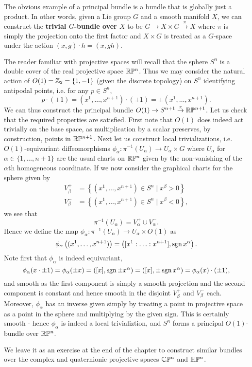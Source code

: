 \begin{exmp}
    The obvious example of a principal bundle is a bundle that is globally just a product. In other words, given
    a Lie group $G$ and a smooth manifold $X$, we can construct the \textbf{trivial $G$-bundle over $X$} to be
    $G\to X\times G\overset{\pi}{\to} X$ where $\pi$ is simply the projection onto the first factor and $X\times G$ is treated as
    a $G$-space under the action $(x,g)\cdot h=(x,gh)$. 
\end{exmp}

\begin{exmp}
    The reader familiar with projective spaces will recall that the sphere $S^n$ is a double cover of the real projective space $\mathbb{R}\mathbb{P}^n$.
    Thus we may consider the natural action of $O(1)=\mathbb{Z}_2=\left\{ 1,-1 \right\}$ (given the discrete topology) on $S^n$ identifying antipodal points,
    i.e. for any $p\in S^n$,
    \[p\cdot (\pm 1)=(x^1,\ldots, x^{n+1})\cdot (\pm 1)=\pm (x^1,\ldots,x^{n+1}).\]
    We can thus construct the principal bundle $O(1)\to S^{n+1}\overset{\pi}{\to} \mathbb{R}\mathbb{P}^{n+1}$. Let us check that the required properties are satisfied.
    First note that $O(1)$ does indeed act trivially on the base space, as multiplication by a scalar preserves, by construction, points in $\mathbb{R}\mathbb{P}^{n+1}$.
    Next let us construct local trivializations, i.e. $O(1)$-equivariant diffeomorphisms $\phi_\alpha:\pi^{-1}(U_\alpha)\to U_\alpha\times G$ where
    $U_\alpha$ for $\alpha\in\{1,\ldots, n+1\}$ are the usual charts on $\mathbb{R}\mathbb{P}^n$ given by the non-vanishing of the $\alpha$th homogeneous coordinate.
    If we now consider the graphical charts for the sphere given by 
    \begin{align*}
        V_\beta^+&=\left\{ (x^1,\ldots,x^{n+1})\in S^n\mid x^\beta>0 \right\}\\
        V_\beta^-&=\left\{ (x^1,\ldots,x^{n+1})\in S^n\mid x^\beta<0 \right\},
    \end{align*}
    we see that
    \[\pi^{-1}(U_\alpha)=V_\alpha^+\cup V_\alpha^-.\]
    Hence we define the map $\phi_\alpha:\pi^{-1}(U_\alpha)\to U_\alpha\times O(1)$ as
    \[\phi_\alpha\left( (x^1,\ldots,x^{n+1}) \right)=\left( [x^1:\ldots:x^{n+1}], \operatorname{sgn} x^{\alpha} \right).\]
    Note first that $\phi_\alpha$ is indeed equivariant,
    \[\phi_\alpha(x\cdot \pm 1)=\phi_\alpha(\pm x)=([x],\operatorname{sgn} \pm x^\alpha)=([x],\pm \operatorname{sgn} x^\alpha)=\phi_\alpha(x)\cdot (\pm 1),\]
    and smooth as the first component is simply a smooth projection and the second component is constant and hence smooth in the disjoint $V_\beta^+$
    and $V_\beta^-$ each. Moreover, $\phi_\alpha$ has an inverse given simply by treating a point in projective space as a point in the sphere
    and multiplying by the given sign. This is certainly smooth - hence $\phi_\alpha$ is indeed a local trivializtion, and $S^n$ forms a principal
    $O(1)$-bundle over $\mathbb{R}\mathbb{P}^n$.

    We leave it as an exercise at the end of the chapter to construct similar bundles over the complex and quaternionic projective spaces $\mathbb{C}\mathbb{P}^n$ and $\mathbb{H}\mathbb{P}^n$.
\end{exmp}

